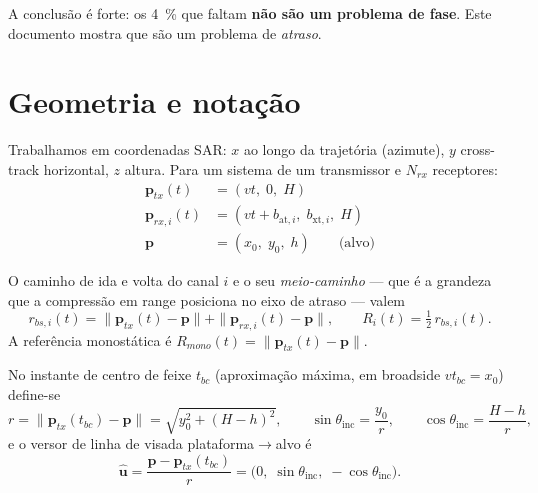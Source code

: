 \documentclass[11pt,a4paper]{article}
\newcommand{\thi}{\theta_{\mathrm{inc}}}
\newcommand{\uhat}{\hat{\bm{u}}}
\begin{document}
\noindent
A conclusão é forte: os \SI{4}{\percent} que faltam \textbf{não são um
problema de fase}. Este documento mostra que são um problema de
\emph{atraso}.

\section{Geometria e notação}

Trabalhamos em coordenadas SAR: $x$ ao longo da trajetória (azimute), $y$
cross-track horizontal, $z$ altura. Para um sistema de um transmissor e
$N_{rx}$ receptores:
\begin{align}
\bm{p}_{tx}(t) &= (v t,\; 0,\; H) \\
\bm{p}_{rx,i}(t) &= (v t + b_{\mathrm{at},i},\; b_{\mathrm{xt},i},\; H) \\
\bm{p} &= (x_0,\; y_0,\; h) \qquad \text{(alvo)}
\end{align}

O caminho de ida e volta do canal $i$ e o seu \emph{meio-caminho} --- que é a
grandeza que a compressão em range posiciona no eixo de atraso --- valem
\begin{equation}
r_{bs,i}(t) = \|\bm{p}_{tx}(t)-\bm{p}\| + \|\bm{p}_{rx,i}(t)-\bm{p}\|,
\qquad
R_i(t) = \tfrac{1}{2}\, r_{bs,i}(t).
\label{eq:Ri}
\end{equation}
A referência monostática é $R_{mono}(t) = \|\bm{p}_{tx}(t)-\bm{p}\|$.

No instante de centro de feixe $t_{bc}$ (aproximação máxima, em broadside
$v t_{bc} = x_0$) define-se
\begin{equation}
r = \|\bm{p}_{tx}(t_{bc})-\bm{p}\| = \sqrt{y_0^2 + (H-h)^2},
\qquad
\sin\thi = \frac{y_0}{r},
\qquad
\cos\thi = \frac{H-h}{r},
\end{equation}
e o versor de linha de visada plataforma$\to$alvo é
\begin{equation}
\uhat = \frac{\bm{p}-\bm{p}_{tx}(t_{bc})}{r} = \bigl(0,\; \sin\thi,\; -\cos\thi\bigr).
\label{eq:uhat}
\end{equation}
\end{document}
